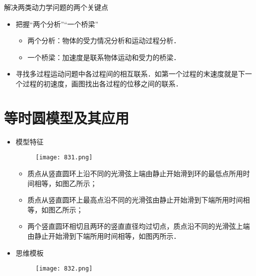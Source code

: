 \documentclass[cn,11pt]{elegantbook}
\begin{document}
\begin{note}
   解决两类动力学问题的两个关键点
   \begin{itemize}
      \item 把握“两个分析”“一个桥梁”
      \begin{itemize}
         \item 两个分析：物体的受力情况分析和运动过程分析．
         \item 一个桥梁：加速度是联系物体运动和受力的桥梁．
      \end{itemize}
      \item 寻找多过程运动问题中各过程间的相互联系．如第一个过程的末速度就是下一个过程的初速度，画图找出各过程的位移之间的联系．
   \end{itemize}   
\end{note}



\section{等时圆模型及其应用}
\begin{itemize}
   \item 模型特征
   \begin{figure}[htbp]
      \centering
      \texttt{[image: 831.png]}
   \end{figure}
   \begin{itemize}
      \item 质点从竖直圆环上沿不同的光滑弦上端由静止开始滑到环的最低点所用时间相等，如图乙所示；
      \item 质点从竖直圆环上最高点沿不同的光滑弦由静止开始滑到下端所用时间相等，如图乙所示；
      \item 两个竖直圆环相切且两环的竖直直径均过切点，质点沿不同的光滑弦上端由静止开始滑到下端所用时间相等，如图丙所示．
   \end{itemize}
   \item 思维模板
   \begin{figure}[htbp]
      \centering
      \texttt{[image: 832.png]}
   \end{figure}

\end{itemize}
\end{document}
